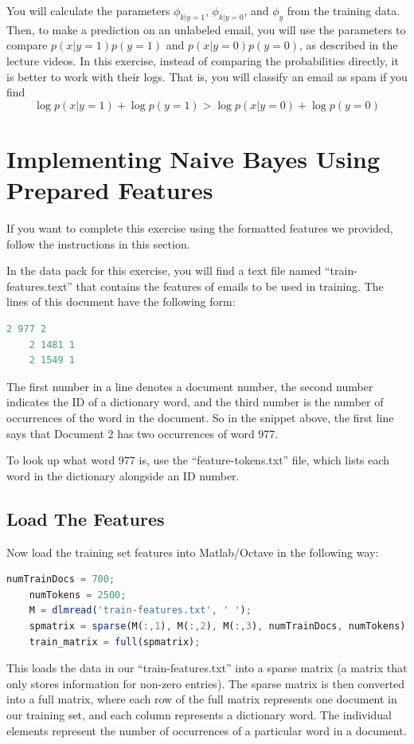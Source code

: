 \documentclass[10pt,a4paper]{article}
\begin{document}
  You will calculate the parameters $\phi_{k\vert y=1}$, $\phi_{k\vert y=0}$, and $\phi_{y}$ from the training data. Then, to make a prediction on an unlabeled email, you will use the parameters to compare  $p(x\vert y=1)p(y=1)$ and  $p(x\vert y=0)p(y=0)$, as described in the lecture videos. In this exercise, instead of comparing the probabilities directly, it is better to work with their logs. That is, you will classify an email as spam if you find
  \begin{displaymath}
    \log p(x\vert y=1)+\log p(y=1)>\log p(x\vert y=0)+\log p(y=0)
  \end{displaymath}


\section{Implementing Naive Bayes Using Prepared Features}
%
  If you want to complete this exercise using the formatted features we provided, follow the instructions in this section.

  In the data pack for this exercise, you will find a text file named ``train-features.text'' that contains the features of emails to be used in training. The lines of this document have the following form:
  \begin{lstlisting}[language=C, basicstyle=\footnotesize, showspaces=false]
    2 977 2
    2 1481 1
    2 1549 1
  \end{lstlisting}

  The first number in a line denotes a document number, the second number indicates the ID of a dictionary word, and the third number is the number of occurrences of the word in the document. So in the snippet above, the first line says that Document 2 has two occurrences of word 977.

  To look up what word 977 is, use the ``feature-tokens.txt'' file, which lists each word in the dictionary alongside an ID number.



  \subsection{Load The Features}
  Now load the training set features into Matlab/Octave in the following way:
  \begin{lstlisting}[language=Octave, basicstyle=\footnotesize, showspaces=false]
    numTrainDocs = 700;
    numTokens = 2500;
    M = dlmread('train-features.txt', ' ');
    spmatrix = sparse(M(:,1), M(:,2), M(:,3), numTrainDocs, numTokens);
    train_matrix = full(spmatrix);
  \end{lstlisting}
  This loads the data in our ``train-features.txt'' into a sparse matrix (a matrix that only stores information for non-zero entries). The sparse matrix is then converted into a full matrix, where each row of the full matrix represents one document in our training set, and each column represents a dictionary word. The individual elements represent the number of occurrences of a particular word in a document.
\end{document}
